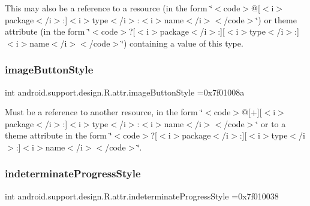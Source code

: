 This may also be a reference to a resource (in the form \char`\"{}$<$code$>$@\mbox{[}$<$i$>$package$<$/i$>$\+:\mbox{]}$<$i$>$type$<$/i$>$\+:$<$i$>$name$<$/i$>$$<$/code$>$\char`\"{}) or theme attribute (in the form \char`\"{}$<$code$>$?\mbox{[}$<$i$>$package$<$/i$>$\+:\mbox{]}\mbox{[}$<$i$>$type$<$/i$>$\+:\mbox{]}$<$i$>$name$<$/i$>$$<$/code$>$\char`\"{}) containing a value of this type. \mbox{\label{classandroid_1_1support_1_1design_1_1R_1_1attr_ad5ae07572c9491c79516688983b64fab}} 
\subsubsection{\texorpdfstring{image\+Button\+Style}{imageButtonStyle}}
{\footnotesize\ttfamily int android.\+support.\+design.\+R.\+attr.\+image\+Button\+Style =0x7f01008a\hspace{0.3cm}{\ttfamily [static]}}

Must be a reference to another resource, in the form \char`\"{}$<$code$>$@\mbox{[}+\mbox{]}\mbox{[}$<$i$>$package$<$/i$>$\+:\mbox{]}$<$i$>$type$<$/i$>$\+:$<$i$>$name$<$/i$>$$<$/code$>$\char`\"{} or to a theme attribute in the form \char`\"{}$<$code$>$?\mbox{[}$<$i$>$package$<$/i$>$\+:\mbox{]}\mbox{[}$<$i$>$type$<$/i$>$\+:\mbox{]}$<$i$>$name$<$/i$>$$<$/code$>$\char`\"{}. \mbox{\label{classandroid_1_1support_1_1design_1_1R_1_1attr_a8b45873d94fc96a0aa003380408c6b79}} 
\subsubsection{\texorpdfstring{indeterminate\+Progress\+Style}{indeterminateProgressStyle}}
{\footnotesize\ttfamily int android.\+support.\+design.\+R.\+attr.\+indeterminate\+Progress\+Style =0x7f010038\hspace{0.3cm}{\ttfamily [static]}}

